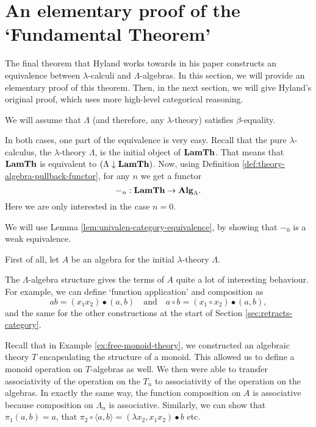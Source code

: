 \section{An elementary proof of the `Fundamental Theorem'}\label{sec:elementary-fundamental-theorem}
The final theorem that Hyland works towards in his paper constructs an equivalence between $ \lambda $-calculi and $ \Lambda $-algebras. In this section, we will provide an elementary proof of this theorem. Then, in the next section, we will give Hyland's original proof, which uses more high-level categorical reasoning.

We will assume that $ \Lambda $ (and therefore, any $ \lambda $-theory) satisfies $ \beta $-equality.

In both cases, one part of the equivalence is very easy. Recall that the pure $ \lambda $-calculus, the $ \lambda $-theory $ \Lambda $, is the initial object of $ \mathbf{LamTh} $. That means that $ \mathbf{LamTh} $ is equivalent to $ (\Lambda \downarrow \mathbf{LamTh}) $. Now, using Definition \ref{def:theory-algebra-pullback-functor}, for any $ n $ we get a functor
\[ -_n : \mathbf{LamTh} \to \mathbf{Alg}_{\Lambda}. \]
Here we are only interested in the case $ n = 0 $.

We will use Lemma \ref{lem:univalen-category-equivalence}, by showing that $ -_0 $ is a weak equivalence.

First of all, let $ A $ be an algebra for the initial $ \lambda $-theory $ \Lambda $.

The $ \Lambda $-algebra structure gives the terms of $ A $ quite a lot of interesting behaviour. For example, we can define `function application' and composition as
\[ a b = (x_1 x_2) \bullet (a, b) \quad \text{and} \quad a \circ b = (x_1 \circ x_2) \bullet (a, b), \]
and the same for the other constructions at the start of Section \ref{sec:retracts-category}.

\begin{remark}
  Recall that in Example \ref{ex:free-monoid-theory}, we constructed an algebraic theory $ T $ encapsulating the structure of a monoid. This allowed us to define a monoid operation on $ T $-algebras as well. We then were able to transfer associativity of the operation on the $ T_n $ to associativity of the operation on the algebras. In exactly the same way, the function composition on $ A $ is associative because composition on $ \Lambda_n $ is associative. Similarly, we can show that $ \pi_1 (a, b) = a $, that $ \pi_2 \circ \langle a, b \rangle = (\lambda x_2, x_1 x_2) \bullet b $ etc.
\end{remark}

